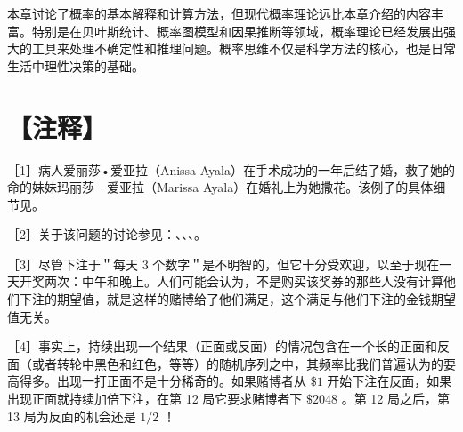 本章讨论了概率的基本解释和计算方法，但现代概率理论远比本章介绍的内容丰富。特别是在贝叶斯统计、概率图模型和因果推断等领域，概率理论已经发展出强大的工具来处理不确定性和推理问题。概率思维不仅是科学方法的核心，也是日常生活中理性决策的基础。

\section*{【注释】}
［1］病人爱丽莎•爱亚拉（Anissa Ayala）在手术成功的一年后结了婚，救了她的命的妹妹玛丽莎－爱亚拉（Marissa Ayala）在婚礼上为她撒花。该例子的具体细节见\cite{ayala1993}。

［2］关于该问题的讨论参见：\cite{rose1972}、\cite{dale1974}、\cite{faber1976}、\cite{goldberg1976}。

［3］尽管下注于＂每天 3 个数字＂是不明智的，但它十分受欢迎，以至于现在一天开奖两次：中午和晚上。人们可能会认为，不是购买该奖券的那些人没有计算他们下注的期望值，就是这样的赌博给了他们满足，这个满足与他们下注的金钱期望值无关。

［4］事实上，持续出现一个结果（正面或反面）的情况包含在一个长的正面和反面（或者转轮中黑色和红色，等等）的随机序列之中，其频率比我们普遍认为的要高得多。出现一打正面不是十分稀奇的。如果赌博者从 $\$ 1$ 开始下注在反面，如果出现正面就持续加倍下注，在第 12 局它要求赌博者下 $\$ 2048$ 。第 12 局之后，第 13 局为反面的机会还是 $1 / 2$ ！ 